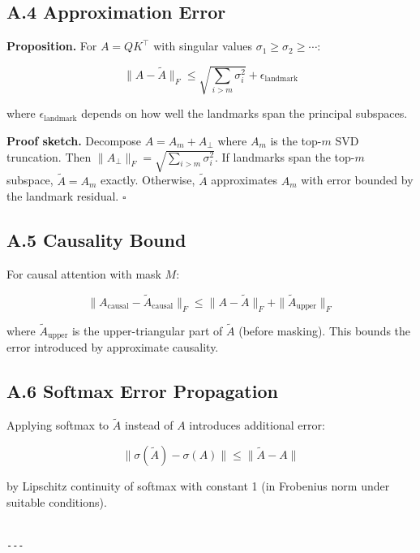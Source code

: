 \subsection{A.4 Approximation Error}

\textbf{Proposition.} For $A = QK^\top$ with singular values $\sigma_1 \ge \sigma_2 \ge \cdots$:

\[
\|A - \tilde{A}\|_F \leq \sqrt{\sum_{i > m} \sigma_i^2} + \epsilon_\text{landmark}
\]

where $\epsilon_\text{landmark}$ depends on how well the landmarks span the 
principal subspaces.

\textbf{Proof sketch.} Decompose $A = A_m + A_\perp$ where $A_m$ is the top-$m$ 
SVD truncation. Then $\|A_\perp\|_F = \sqrt{\sum_{i>m} \sigma_i^2}$. If 
landmarks span the top-$m$ subspace, $\tilde{A} = A_m$ exactly. Otherwise, 
$\tilde{A}$ approximates $A_m$ with error bounded by the landmark residual. 
$\square$

\subsection{A.5 Causality Bound}

For causal attention with mask $M$:

\[
\|A_\text{causal} - \tilde{A}_\text{causal}\|_F \leq \|A - \tilde{A}\|_F + \|\tilde{A}_\text{upper}\|_F
\]

where $\tilde{A}_\text{upper}$ is the upper-triangular part of $\tilde{A}$ 
(before masking). This bounds the error introduced by approximate causality.

\subsection{A.6 Softmax Error Propagation}

Applying softmax to $\tilde{A}$ instead of $A$ introduces additional error:

\[
\|\sigma(\tilde{A}) - \sigma(A)\| \le \|\tilde{A} - A\|
\]

by Lipschitz continuity of softmax with constant 1 (in Frobenius norm under 
suitable conditions).
\begin{lstlisting}

---
\end{lstlisting}